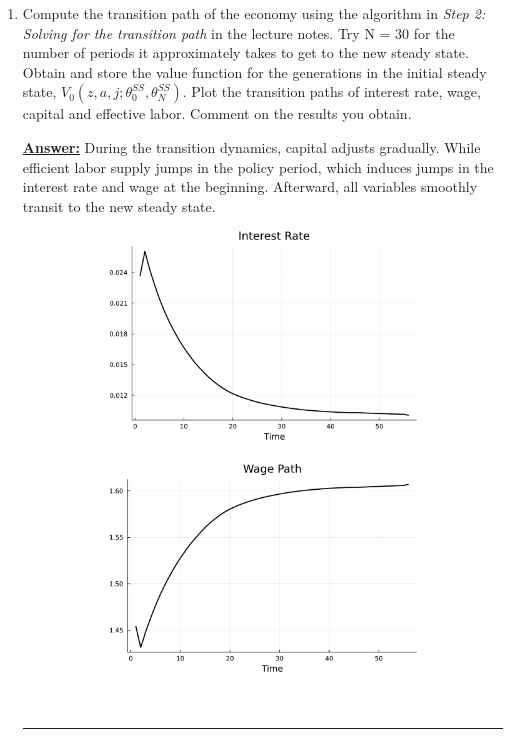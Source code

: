 \documentclass{article} %
\theoremstyle{definition}
\newenvironment{solution}[1][Answer]{\begin{singlespace}\underline{\textbf{#1:}}\quad }{\ \rule{0.3em}{0.3em}\end{singlespace}} %
\begin{document}
\begin{enumerate}
\item  Compute the transition path of the economy using the algorithm in \textit{Step 2: Solving for the transition path} in the lecture notes. Try N = 30 for the
  number of periods it approximately takes to get to the new steady state. Obtain and store the value function for the generations in the initial steady state, $ V_0(z,a,j; \theta_0^{SS}, \theta_N^{SS}) $. Plot the transition paths of interest rate, wage, capital and effective labor. Comment on the results you obtain.
  \begin{solution}
    During the transition dynamics, capital adjusts gradually. While efficient labor supply jumps in the policy period, which induces jumps in the interest rate and wage at the beginning. Afterward, all variables smoothly transit to the new steady state.
    \begin{figure}
      \centering
      \begin{subfigure}[b]{0.475\textwidth}
        \centering
        \includegraphics[width=\textwidth]{Figures/interest_rate.pdf}
      \end{subfigure}
      \hfill
      \begin{subfigure}[b]{0.475\textwidth}  
        \centering 
        \includegraphics[width=\textwidth]{Figures/wage.pdf}

\end{subfigure}
\end{figure}
\end{solution}
\end{enumerate}
\end{document}
